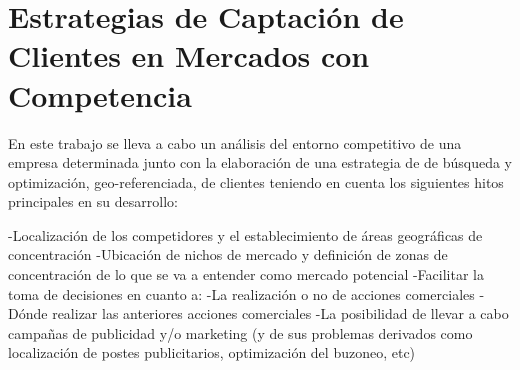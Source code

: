 \chapter{Estrategias de Captación de Clientes en Mercados con Competencia}




    En este trabajo se lleva a cabo un análisis del entorno competitivo de una empresa determinada junto con la elaboración de una estrategia de de búsqueda y optimización, geo-referenciada, de clientes teniendo en cuenta los siguientes hitos principales en su desarrollo:

-Localización de los competidores y el establecimiento de áreas geográficas de concentración
-Ubicación de nichos de mercado y definición de zonas de concentración de lo que se va a entender como mercado potencial
	    -Facilitar la toma de decisiones en cuanto a: 
		    -La realización o no de acciones comerciales
	 	    -Dónde realizar las anteriores acciones comerciales
    -La posibilidad de llevar a cabo campañas de publicidad y/o marketing (y de sus problemas derivados como localización de postes publicitarios, optimización del buzoneo, etc)

